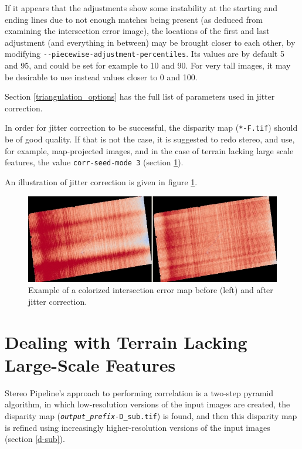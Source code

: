 If it appears that the adjustments show some instability at the starting
and ending lines due to not enough matches being present (as deduced
from examining the intersection error image), the locations of the first
and last adjustment (and everything in between) may be brought closer to
each other, by modifying \texttt{-\/-piecewise-adjustment-percentiles}.
Its values are by default 5 and 95, and could be set for example to 10
and 90. For very tall images, it may be desirable to use instead values
closer to 0 and 100.

Section \ref{triangulation_options} has the full list of parameters
used in jitter correction.

In order for jitter correction to be successful, the disparity map
(\texttt{*-F.tif}) should be of good quality. If that is not the case,
it is suggested to redo stereo, and use, for example, map-projected
images, and in the case of terrain lacking large scale features, the
value \texttt{corr-seed-mode 3} (section \ref{sparse-disp}).

An illustration of jitter correction is given in figure \ref{fig:jitter-example}.

\begin{figure}[h!]
\centering
  \includegraphics[width=6.0in]{images/jitter.jpg}
\caption{Example of a colorized intersection error map before (left) and
  after jitter correction.}
\label{fig:jitter-example}
\end{figure}


\section{Dealing with Terrain Lacking Large-Scale Features}
\label{sparse-disp}

Stereo Pipeline's approach to performing correlation is a two-step
pyramid algorithm, in which low-resolution versions of the input images
are created, the disparity map
(\texttt{\textit{output\_prefix}-D\_sub.tif}) is found, and then this
disparity map is refined using increasingly higher-resolution versions
of the input images (section \ref{d-sub}).

